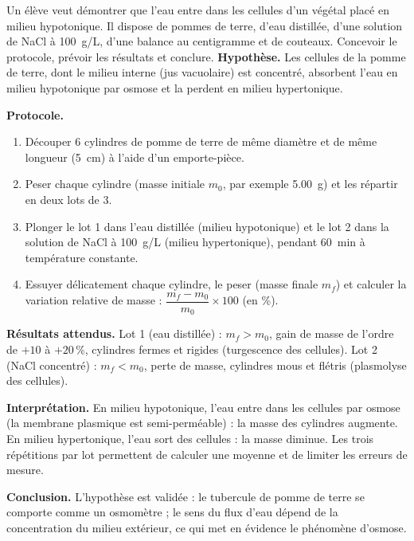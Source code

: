 \documentclass[11pt]{article}
\begin{document}
\begin{exoresolu}
Un élève veut démontrer que l'eau entre dans les cellules d'un végétal placé en milieu hypotonique. Il dispose de pommes de terre, d'eau distillée, d'une solution de NaCl à \SI{100}{g/L}, d'une balance au centigramme et de couteaux. Concevoir le protocole, prévoir les résultats et conclure.
\tcblower
\textbf{Hypothèse.} Les cellules de la pomme de terre, dont le milieu interne (jus vacuolaire) est concentré, absorbent l'eau en milieu hypotonique par osmose et la perdent en milieu hypertonique.

\textbf{Protocole.}
\begin{enumerate}
\item Découper 6 cylindres de pomme de terre de même diamètre et de même longueur (\SI{5}{cm}) à l'aide d'un emporte-pièce.
\item Peser chaque cylindre (masse initiale $m_0$, par exemple \SI{5,00}{g}) et les répartir en deux lots de 3.
\item Plonger le lot 1 dans l'eau distillée (milieu hypotonique) et le lot 2 dans la solution de NaCl à \SI{100}{g/L} (milieu hypertonique), pendant \SI{60}{min} à température constante.
\item Essuyer délicatement chaque cylindre, le peser (masse finale $m_f$) et calculer la variation relative de masse : $\dfrac{m_f - m_0}{m_0} \times 100$ (en \%).
\end{enumerate}

\textbf{Résultats attendus.} Lot 1 (eau distillée) : $m_f > m_0$, gain de masse de l'ordre de $+10$ à $+20\,\%$, cylindres fermes et rigides (turgescence des cellules). Lot 2 (NaCl concentré) : $m_f < m_0$, perte de masse, cylindres mous et flétris (plasmolyse des cellules).

\textbf{Interprétation.} En milieu hypotonique, l'eau entre dans les cellules par osmose (la membrane plasmique est semi-perméable) : la masse des cylindres augmente. En milieu hypertonique, l'eau sort des cellules : la masse diminue. Les trois répétitions par lot permettent de calculer une moyenne et de limiter les erreurs de mesure.

\textbf{Conclusion.} L'hypothèse est validée : le tubercule de pomme de terre se comporte comme un osmomètre ; le sens du flux d'eau dépend de la concentration du milieu extérieur, ce qui met en évidence le phénomène d'osmose.
\end{exoresolu}
\end{document}
